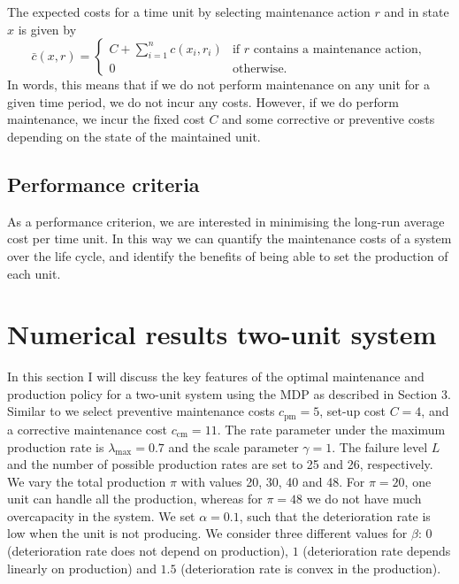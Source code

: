 \documentclass[a4paper,12pt]{article}
\begin{document}
The expected costs for a time unit by selecting maintenance action $r$ and in state $x$ is given by
$$
\bar{c}(x,r) = \begin{cases}
C + \sum_{i=1}^{n}c(x_i, r_i) &\text{if } r \text{ contains a maintenance action},\\
0 &\text{otherwise}.
\end{cases}
$$
In words, this means that if we do not perform maintenance on any unit for a given time period, we do not incur any costs. However, if we do perform maintenance, we incur the fixed cost $C$ and some corrective or preventive costs depending on the state of the maintained unit.
\subsection{Performance criteria}
As a performance criterion, we are interested in minimising the long-run average cost per time unit. In this way we can quantify the maintenance costs of a system over the life cycle, and identify the benefits of being able to set the production of each unit. 

\section{Numerical results two-unit system}
In this section I will discuss the key features of the optimal maintenance and production policy for a two-unit system using the MDP as described in Section 3. Similar to \cite{OLDEKEIZER2018319} we select preventive maintenance costs $c_\text{pm} = 5$, set-up cost $C = 4$, and a corrective maintenance cost $c_\text{cm} = 11$. The rate parameter under the maximum production rate is $\lambda_{\text{max}} = 0.7$ and the scale parameter $\gamma = 1$. The failure level $L$ and the number of possible production rates are set to 25 and 26, respectively. We vary the total production $\pi$ with values 20, 30, 40 and 48. For $\pi = 20$, one unit can handle all the production, whereas for $\pi = 48$ we do not have much overcapacity in the system. We set $\alpha = 0.1$, such that the deterioration rate is low when the unit is not producing. We consider three different values for $\beta$:  $0$ (deterioration rate does not depend on production), $1$ (deterioration rate depends linearly on production) and $1.5$ (deterioration rate is convex in the production).
\end{document}
